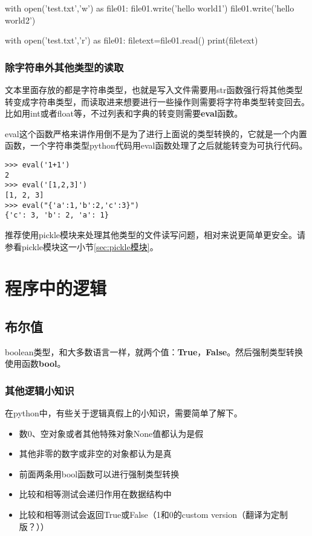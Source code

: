 \documentclass[12pt,oneside]{book}
\begin{document}
\begin{common-format}
\begin{tcbpython}[]
with open('test.txt','w') as file01:
    file01.write('hello world1\n')
    file01.write('hello world2\n')

with open('test.txt','r') as file01:
    filetext=file01.read()
    print(filetext)
\end{tcbpython}



\subsection{除字符串外其他类型的读取}
文本里面存放的都是字符串类型，也就是写入文件需要用str函数强行将其他类型转变成字符串类型，而读取进来想要进行一些操作则需要将字符串类型转变回去。比如用int或者float等，不过列表和字典的转变则需要\textbf{eval}函数。

eval这个函数严格来讲作用倒不是为了进行上面说的类型转换的，它就是一个内置函数，一个字符串类型python代码用eval函数处理了之后就能转变为可执行代码。
\begin{Verbatim}
>>> eval('1+1')
2
>>> eval('[1,2,3]')
[1, 2, 3]
>>> eval("{'a':1,'b':2,'c':3}")
{'c': 3, 'b': 2, 'a': 1}
\end{Verbatim}

推荐使用pickle模块来处理其他类型的文件读写问题，相对来说更简单更安全。请参看pickle模块这一小节\ref{sec:pickle模块}。





\chapter{程序中的逻辑}
\section{布尔值}
\label{sec:布尔值}
boolean类型，和大多数语言一样，就两个值：\textbf{True}，\textbf{False}。然后强制类型转换使用函数\textbf{bool}。

\subsection{其他逻辑小知识}
在python中，有些关于逻辑真假上的小知识，需要简单了解下。
\begin{itemize}
\item 数0、空对象或者其他特殊对象None值都认为是假
\item 其他非零的数字或非空的对象都认为是真
\item 前面两条用bool函数可以进行强制类型转换
\item 比较和相等测试会递归作用在数据结构中
\item 比较和相等测试会返回True或False（1和0的custom version（翻译为定制版？））
\end{itemize}


\end{common-format}
\end{document}
